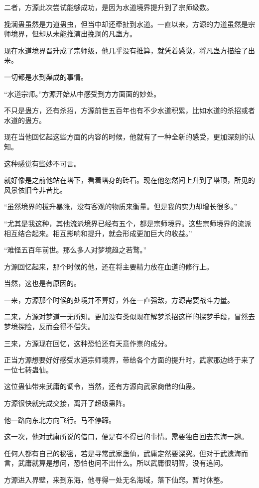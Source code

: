\begin{this_body}
二者，方源此次尝试能够成功，是因为水道境界提升到了宗师级数。

挽澜蛊虽然是力道蛊虫，但当中却还牵扯到水道。一直以来，方源的力道虽然是宗师境界，但却从未能推演出挽澜的凡蛊方。

现在水道境界晋升成了宗师级，他几乎没有推算，就凭着感觉，将凡蛊方描绘了出来。

一切都是水到渠成的事情。

“水道宗师。”方源开始从中感受到方方面面的妙处。

不只是蛊方，还有杀招，方源前世五百年也有不少水道积累，比如水道的杀招或者水道的蛊方。

现在当他回忆起这些方面的内容的时候，他就有了一种全新的感受，更加深刻的认知。

这种感觉有些妙不可言。

就好像是之前他站在塔下，看着塔身的砖石。现在他忽然间上升到了塔顶，所见的风景依旧今非昔比。

“虽然境界的拔升暴涨，没有客观的物质来衡量。但是我的实力却增长很多。”

“尤其是我这种，其他流派境界已经有五个，都是宗师境界。这些宗师境界的流派相互结合起来。相互影响和提升，就会形成更加巨大的收益。”

“难怪五百年前世。那么多人对梦境趋之若鹜。”

方源回忆起来，那个时候的他，还在将主要精力放在血道的修行上。

当然，这也是有原因的。

一来，方源那个时候的处境并不算好，外在一直强敌，方源需要战斗力量。

二来，方源对梦道一无所知。更加没有类似现在解梦杀招这样的探梦手段，冒然去梦境探险，反而会得不偿失。

三来，方源现在回忆，这种恐怕还有天意作祟的成分。

正当方源想要好好感受水道宗师境界，带给各个方面的提升时，武家那边终于来了一位七转蛊仙。

这位蛊仙带来武庸的调令，当然，还有方源向武家商借的仙蛊。

方源很快就完成交接，离开了超级蛊阵。

他一路向东北方向飞行。马不停蹄。

这一次，他对武庸所说的借口，便是有不得已的事情。需要独自回去东海一趟。

任何人都有自己的秘密，若是寻常武家蛊仙，武庸定然要深究。但对于武遗海而言，武庸就算是想问，恐怕也问不出什么。所以武庸很明智，没有追问。

方源进入界壁，来到东海，他寻得一处无名海域，落下仙窍。暂时休整。


\end{this_body}
